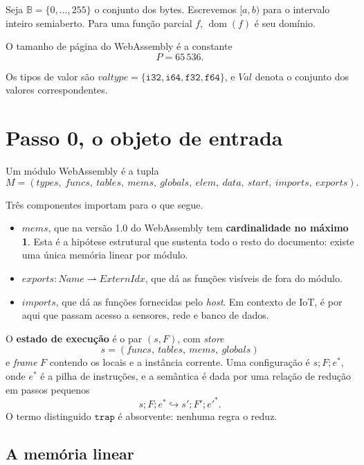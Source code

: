 \documentclass[11pt,a4paper]{article}
\theoremstyle{definition}
\begin{document}
Seja $\mathbb{B} = \{0,\dots,255\}$ o conjunto dos bytes. Escrevemos $[a,b)$ para
o intervalo inteiro semiaberto. Para uma função parcial $f$, $\operatorname{dom}(f)$
é seu domínio.

O tamanho de página do WebAssembly é a constante
\[
  P = 65\,536 .
\]

Os tipos de valor são
$\mathit{valtype} = \{\mathtt{i32}, \mathtt{i64}, \mathtt{f32}, \mathtt{f64}\}$,
e $\mathit{Val}$ denota o conjunto dos valores correspondentes.

\section{Passo 0, o objeto de entrada}

Um módulo WebAssembly é a tupla
\[
  M = (\mathit{types},\ \mathit{funcs},\ \mathit{tables},\ \mathit{mems},\
       \mathit{globals},\ \mathit{elem},\ \mathit{data},\ \mathit{start},\
       \mathit{imports},\ \mathit{exports}).
\]

Três componentes importam para o que segue.

\begin{itemize}[leftmargin=1.4em]
  \item $\mathit{mems}$, que na versão 1.0 do WebAssembly tem
        \textbf{cardinalidade no máximo 1}. Esta é a hipótese estrutural que
        sustenta todo o resto do documento: existe uma única memória linear por
        módulo.
  \item $\mathit{exports} : \mathit{Name} \rightharpoonup \mathit{ExternIdx}$,
        que dá as funções visíveis de fora do módulo.
  \item $\mathit{imports}$, que dá as funções fornecidas pelo \emph{host}. Em
        contexto de IoT, é por aqui que passam acesso a sensores, rede e banco de
        dados.
\end{itemize}

O \textbf{estado de execução} é o par $(s,F)$, com \emph{store}
\[
  s = (\mathit{funcs},\ \mathit{tables},\ \mathit{mems},\ \mathit{globals})
\]
e \emph{frame} $F$ contendo os locais e a instância corrente. Uma configuração é
$s; F; e^{*}$, onde $e^{*}$ é a pilha de instruções, e a semântica é dada por uma
relação de redução em passos pequenos
\[
  s; F; e^{*} \hookrightarrow s'; F'; e'^{*} .
\]
O termo distinguido $\mathtt{trap}$ é absorvente: nenhuma regra o reduz.

\subsection{A memória linear}
\end{document}
